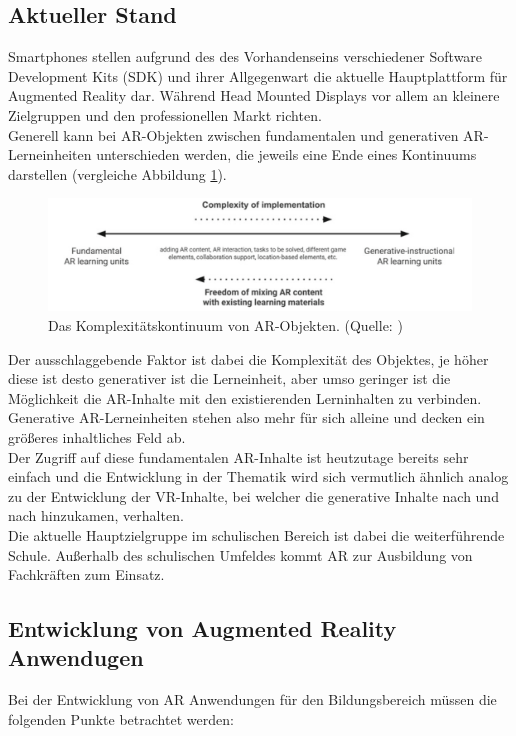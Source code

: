 \subsection{Aktueller Stand}
Smartphones stellen aufgrund des des Vorhandenseins verschiedener Software Development Kits (SDK) und ihrer Allgegenwart die aktuelle Hauptplattform für Augmented Reality dar. Während Head Mounted Displays vor allem an kleinere Zielgruppen und den professionellen Markt richten. \\
Generell kann bei AR-Objekten zwischen fundamentalen und generativen AR-Lerneinheiten unterschieden werden, die jeweils eine Ende eines Kontinuums darstellen (vergleiche Abbildung \ref{fig:komplexitätskontinuum}).
\begin{figure}
\centering
\includegraphics[width=1.0\textwidth]{Abbildungen/ar-object-continuum.png}
\caption[Komplexitätskontinuum von AR-Objekten]{Das Komplexitätskontinuum von AR-Objekten. (Quelle: \cite{geroimenko:ar-in-education})}
\label{fig:komplexitätskontinuum}
\end{figure}
Der ausschlaggebende Faktor ist dabei die Komplexität des Objektes, je höher diese ist desto generativer ist die Lerneinheit, aber umso geringer ist die Möglichkeit die AR-Inhalte mit den existierenden Lerninhalten zu verbinden. \\
Generative AR-Lerneinheiten stehen also mehr für sich alleine und decken ein größeres inhaltliches Feld ab. \\
Der Zugriff auf diese fundamentalen AR-Inhalte ist heutzutage bereits sehr einfach und die Entwicklung in der Thematik wird sich vermutlich ähnlich analog zu der Entwicklung der VR-Inhalte, bei welcher die generative Inhalte nach und nach hinzukamen, verhalten.\\
Die aktuelle Hauptzielgruppe im schulischen Bereich ist dabei die weiterführende Schule. Außerhalb des schulischen Umfeldes kommt AR zur Ausbildung von Fachkräften zum Einsatz.

\subsection{Entwicklung von Augmented Reality Anwendugen}
Bei der Entwicklung von AR Anwendungen für den Bildungsbereich müssen die folgenden Punkte betrachtet werden:
